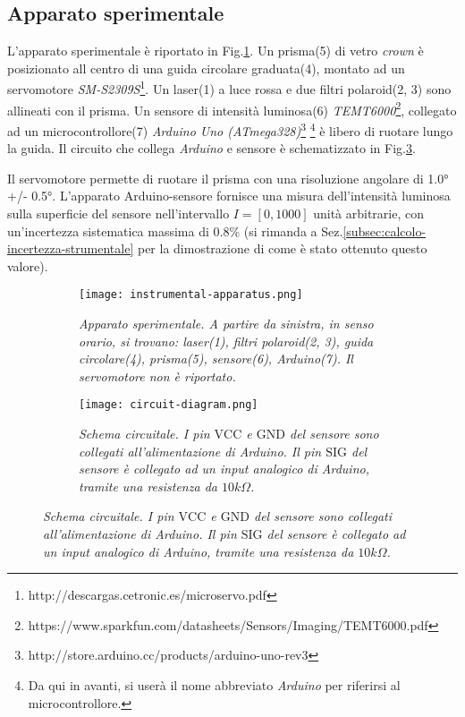 \subsection{Apparato sperimentale}\label{subsec:apparato-sperimentale}
  L’apparato sperimentale è riportato in Fig.\ref{fig:apparato-strumentale}.
  Un prisma(5) di vetro \emph{crown} è posizionato all centro di una guida circolare graduata(4),
  montato ad un servomotore \emph{SM-S2309S}\footnote{http://descargas.cetronic.es/microservo.pdf}.
  Un laser(1) a luce rossa e due filtri polaroid(2, 3) sono
  allineati con il prisma. Un sensore di intensità luminosa(6) \emph{TEMT6000}\footnote{https://www.sparkfun.com/datasheets/Sensors/Imaging/TEMT6000.pdf},
  collegato ad un microcontrollore(7) \emph{Arduino Uno (ATmega328)}\footnote{http://store.arduino.cc/products/arduino-uno-rev3}
  \footnote{Da qui in avanti, si userà il nome abbreviato \emph{Arduino} per riferirsi al microcontrollore.}
  è libero di ruotare lungo la guida.
  Il circuito che collega \emph{Arduino} e sensore è schematizzato in Fig.\ref{fig:diagramma-circuito}.

  Il servomotore permette di ruotare il prisma con una risoluzione angolare di 1.0° +/- 0.5°.
  L'apparato Arduino-sensore fornisce una misura dell'intensità luminosa
  sulla superficie del sensore nell'intervallo $I = [0, 1000]$ unità arbitrarie,
  con un'incertezza sistematica massima di $0.8\%$ (si rimanda a Sez.\ref{subsec:calcolo-incertezza-strumentale}
  per la dimostrazione di come è stato ottenuto questo valore).
%
  \begin{figure}[h]
    \centering
    \caption{Apparato sperimentale e schema circuitale.}
    \begin{subfigure}{.4\textwidth}
      \texttt{[image: instrumental-apparatus.png]}
      \caption{
        \emph{
          Apparato sperimentale. A partire da sinistra, in senso orario,
          si trovano: laser(1), filtri polaroid(2, 3), guida circolare(4),
          prisma(5), sensore(6), Arduino(7). Il servomotore non è riportato.
        }
      }
      \label{fig:apparato-strumentale}
    \end{subfigure}%
    \hspace{20mm}
    \begin{subfigure}{.4\textwidth}
      \texttt{[image: circuit-diagram.png]}
      \caption{
        \emph{
          Schema circuitale. I pin $\text{VCC}$ e $\text{GND}$ del sensore sono collegati
          all'alimentazione di Arduino. Il pin $\text{SIG}$
          del sensore è collegato ad un input analogico di Arduino, tramite una
          resistenza da $10k\Omega$.
        }
      }
      \label{fig:diagramma-circuito}
    \end{subfigure}
  \end{figure}
%

